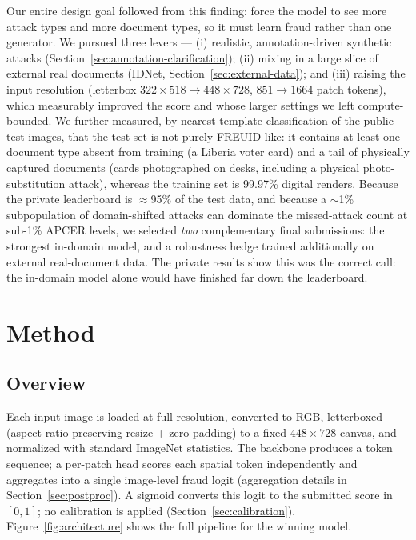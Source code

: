 \documentclass[11pt,a4paper]{article}
\begin{document}
Our entire design goal followed from this finding: force the model to see more
attack types and more document types, so it must learn fraud rather than one
generator. We pursued three levers --- (i) realistic, annotation-driven synthetic
attacks (Section~\ref{sec:annotation-clarification}); (ii) mixing in a large slice
of external real documents (IDNet, Section~\ref{sec:external-data}); and
(iii) raising the input resolution (letterbox $322\times518 \rightarrow
448\times728$, $851 \rightarrow 1664$ patch tokens), which measurably improved the
score and whose larger settings we left compute-bounded. We further measured, by
nearest-template classification of the public test images, that the test set is not
purely FREUID-like: it contains at least one document type absent from training (a
Liberia voter card) and a tail of physically captured documents (cards photographed
on desks, including a physical photo-substitution attack), whereas the training set
is 99.97\% digital renders. Because the private leaderboard is $\approx$95\% of the
test data, and because a $\sim$1\% subpopulation of domain-shifted attacks can
dominate the missed-attack count at sub-1\% APCER levels, we selected \emph{two}
complementary final submissions: the strongest in-domain model, and a robustness
hedge trained additionally on external real-document data. The private results show
this was the correct call: the in-domain model alone would have finished far down
the leaderboard.

\section{Method}
\label{sec:method}

\subsection{Overview}
\label{sec:overview}
Each input image is loaded at full resolution, converted to RGB, letterboxed
(aspect-ratio-preserving resize + zero-padding) to a fixed $448\times728$ canvas,
and normalized with standard ImageNet statistics. The backbone produces a token
sequence; a per-patch head scores each spatial token independently and aggregates
into a single image-level fraud logit (aggregation details in
Section~\ref{sec:postproc}). A sigmoid converts this logit to the submitted score
in $[0,1]$; no calibration is applied (Section~\ref{sec:calibration}).
Figure~\ref{fig:architecture} shows the full pipeline for the winning model.
\end{document}
